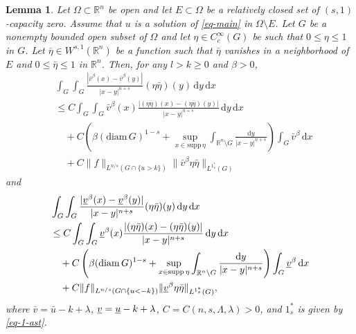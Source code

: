 \documentclass{amsart}
\theoremstyle{plain}
\newtheorem{lemma}[theorem]{Lemma}
\theoremstyle{definition}
\numberwithin{equation}{section}
\begin{document}
\begin{lemma}\label{lem-Caccio1}
Let $\Omega \subset \mathbb{R}^n$ be open and let $E \subset \Omega$ be a relatively closed set of $(s, 1)$-capacity zero. Assume that $u$ is a solution of \eqref{eq-main} in $\Omega \setminus E$. Let $G$ be a nonempty bounded open subset of $\Omega$ and let $\eta \in C^\infty_c(G)$ be such that $0 \leq \eta \leq 1$ in $G$. Let $\bar{\eta} \in W^{s, 1}(\mathbb{R}^n)$ be a function such that $\bar{\eta}$ vanishes in a neighborhood of $E$ and $0 \leq \bar{\eta} \leq 1$ in $\mathbb{R}^n$. Then, for any $l>k\geq 0$ and $\beta>0$,
\begin{equation}\label{eq-Caccio1-sub}
\begin{split}
&\int_{G} \int_{G} \frac{|\bar{v}^\beta(x) - \bar{v}^\beta(y)|}{|x-y|^{n+s}} (\eta\bar{\eta})(y) \,\mathrm{d}y \,\mathrm{d}x \\
&\leq C \int_{G} \int_{G} \bar{v}^\beta(x) \frac{|(\eta\bar{\eta})(x)-(\eta\bar{\eta})(y)|}{|x-y|^{n+s}} \,\mathrm{d}y \,\mathrm{d}x \\
&\quad + C \left( \beta (\mathrm{diam}\, G)^{1-s} + \sup_{x \in \mathrm{supp}\,\eta} \int_{\mathbb{R}^n \setminus G} \frac{\mathrm{d}y}{|x-y|^{n+s}} \right) \int_G \bar{v}^\beta \,\mathrm{d}x \\
&\quad + C \|f\|_{L^{n/s}(G \cap \{u>k\})} \|\bar{v}^\beta\eta\bar{\eta}\|_{L^{1^{\ast}_s}(G)}
\end{split}
\end{equation}
and
\begin{equation}\label{eq-Caccio1-super}
\begin{split}
&\int_{G} \int_{G} \frac{|\underbar{$v$}^\beta(x) - \underbar{$v$}^\beta(y)|}{|x-y|^{n+s}} (\eta\bar{\eta})(y) \,\mathrm{d}y \,\mathrm{d}x \\
&\leq C \int_{G} \int_{G} \underbar{$v$}^\beta(x) \frac{|(\eta\bar{\eta})(x)-(\eta\bar{\eta})(y)|}{|x-y|^{n+s}} \,\mathrm{d}y \,\mathrm{d}x \\
&\quad + C \left( \beta (\mathrm{diam}\, G)^{1-s} + \sup_{x \in \mathrm{supp}\,\eta} \int_{\mathbb{R}^n \setminus G} \frac{\mathrm{d}y}{|x-y|^{n+s}} \right) \int_G \underbar{$v$}^\beta \,\mathrm{d}x \\
&\quad + C \|f\|_{L^{n/s}(G \cap \{u<-k\})} \|\underbar{$v$}^\beta\eta\bar{\eta}\|_{L^{1^{\ast}_s}(G)},
\end{split}
\end{equation}
where $\bar{v}=\bar{u}-k+\lambda$, $\underbar{$v$}=\underbar{$u$}-k+\lambda$, $C=C(n, s, \Lambda, \lambda)>0$, and $1^{\ast}_s$ is given by \eqref{eq-1-ast}.
\end{lemma}
\end{document}
